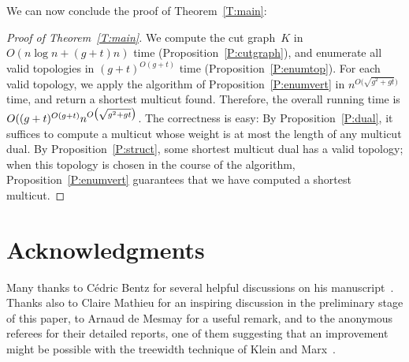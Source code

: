 \documentclass[11pt]{article}
\theoremstyle{plain}  \newtheorem{theorem}{Theorem}[section]
\theoremstyle{definition}
\begin{document}
We can now conclude the proof of Theorem~\ref{T:main}:
\begin{proof}[Proof of Theorem~\ref{T:main}]
  We compute the cut graph~$K$ in $O(n\log n+(g+t)n)$ time
  (Proposition~\ref{P:cutgraph}), and enumerate all valid topologies in
  $(g+t)^{O(g+t)}$ time (Proposition~\ref{P:enumtop}).  For each valid
  topology, we apply the algorithm of Proposition~\ref{P:enumvert} in
  $n^{O\big(\sqrt{g^2+gt}\big)}$ time, and return a shortest multicut
  found.  Therefore, the overall running time is
  $O({(g+t)^{O(g+t)}}\*{n^{O\big(\sqrt{g^2+gt}\big)}}$.  The correctness is
  easy: By Proposition~\ref{P:dual}, it suffices to compute a multicut
  whose weight is at most the length of any multicut dual.  By
  Proposition~\ref{P:struct}, some shortest multicut dual has a valid
  topology; when this topology is chosen in the course of the algorithm,
  Proposition~\ref{P:enumvert} guarantees that we have computed a shortest
  multicut.
\end{proof}

\section*{Acknowledgments}

Many thanks to C\'edric Bentz for several helpful discussions on his
manuscript~\cite{b-ptapm-12}.  Thanks also to Claire Mathieu for an
inspiring discussion in the preliminary stage of this paper, to Arnaud de
Mesmay for a useful remark, and to the anonymous referees for their
detailed reports, one of them suggesting that an improvement might be
possible with the treewidth technique of Klein and Marx~\cite{km-spktc-12}.
\end{document}
